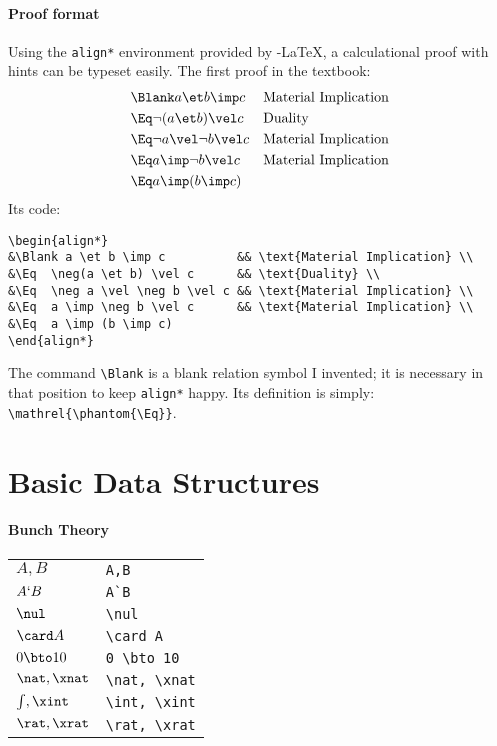 \documentclass{article}
\begin{document}
\paragraph{Proof format}
Using the \verb/align*/ environment provided by \AmS-\LaTeX, a calculational
proof with hints can be typeset easily.  The first
proof in the textbook:
\begin{align*}
&\Blank a \et b \imp c && \text{Material Implication} \\
&\Eq \neg(a \et b) \vel c && \text{Duality} \\
&\Eq \neg a \vel \neg b \vel c && \text{Material Implication} \\
&\Eq a \imp \neg b \vel c && \text{Material Implication} \\
&\Eq a \imp (b \imp c)
\end{align*}
Its code:
\begin{verbatim}
\begin{align*}
&\Blank a \et b \imp c          && \text{Material Implication} \\
&\Eq  \neg(a \et b) \vel c      && \text{Duality} \\
&\Eq  \neg a \vel \neg b \vel c && \text{Material Implication} \\
&\Eq  a \imp \neg b \vel c      && \text{Material Implication} \\
&\Eq  a \imp (b \imp c)
\end{align*}
\end{verbatim}
The command \verb/\Blank/ is a blank relation symbol I invented; it is
necessary in that position to keep \verb/align*/ happy.  Its
definition is simply: \verb/\mathrel{\phantom{\Eq}}/.


\section{Basic Data Structures}

\paragraph{Bunch Theory}
\begin{center}
\begin{tabular}{ll}
$A,B$ & \verb$A,B$ \\
$A`B$ & \verb$A`B$ \\
$\nul$ & \verb$\nul$ \\
$\card A$ & \verb$\card A$ \\
$0 \bto 10$ & \verb$0 \bto 10$ \\
$\nat, \xnat$ & \verb$\nat, \xnat$ \\
$\int, \xint$ & \verb$\int, \xint$ \\
$\rat, \xrat$ & \verb$\rat, \xrat$
\end{tabular}
\end{center}
\end{document}
